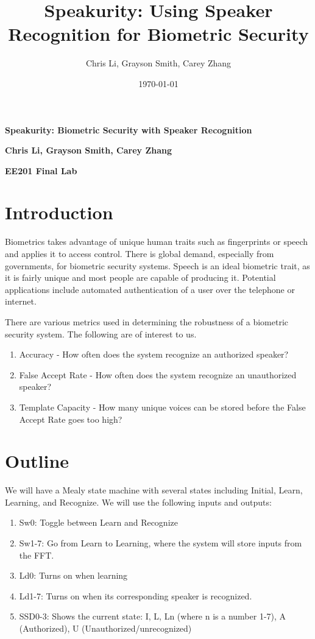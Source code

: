 \documentclass[11pt,letterpaper,oneside]{article}
\begin{document}
	\thispagestyle{empty}
	\title{Speakurity: Using Speaker Recognition for Biometric Security}
	\author{Chris Li, Grayson Smith, Carey Zhang}
	\date{\today}
	
	\centerline{\Large \bf Speakurity: Biometric Security with Speaker Recognition} %
  
	\medskip
  
	\centerline{\bf Chris Li, Grayson Smith, Carey Zhang}
	\centerline{\bf EE201 Final Lab}
	
	\section{Introduction}
	Biometrics takes advantage of unique human traits such as fingerprints or speech and applies it to access control.  
	There is global demand, especially from governments, for biometric security systems.  Speech is an ideal biometric trait, 
	as it is fairly unique and most people are capable of producing it.  Potential applications include automated authentication
	of a user over the telephone or internet.
	
	
	There are various metrics used in determining the robustness of a biometric security system\cite{security}.  The following are of interest to us.
	\begin{enumerate}
		\item Accuracy - How often does the system recognize an authorized speaker?
		\item False Accept Rate - How often does the system recognize an unauthorized speaker?
		\item Template Capacity - How many unique voices can be stored before the False Accept Rate goes too high?
	\end{enumerate}

	\section{Outline}
	We will have a Mealy state machine with several states including Initial, Learn, Learning, and Recognize.  We will use the following inputs and outputs:
	\begin{enumerate}
		\item Sw0: Toggle between Learn and Recognize
		\item Sw1-7: Go from Learn to Learning, where the system will store inputs from the FFT.
		\item Ld0: Turns on when learning
		\item Ld1-7: Turns on when its corresponding speaker is recognized.
		\item SSD0-3: Shows the current state: I, L, Ln (where n is a number 1-7), A (Authorized), U (Unauthorized/unrecognized)
	\end{enumerate}
	
\end{document}
